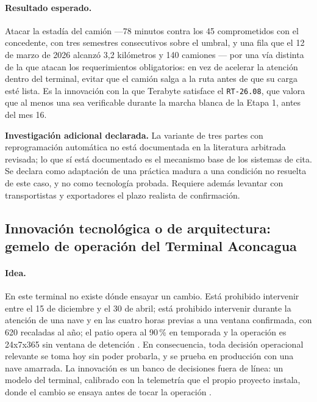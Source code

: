\paragraph*{Resultado esperado.}
Atacar la estadía del camión —78 minutos contra los 45 comprometidos con el
concedente, con tres semestres consecutivos sobre el umbral, y una fila que el
12 de marzo de 2026 alcanzó 3,2 kilómetros y 140 camiones \Hecho— por una vía
distinta de la que atacan los requerimientos obligatorios: en vez de acelerar
la atención dentro del terminal, evitar que el camión salga a la ruta antes de
que su carga esté lista. Es la innovación con la que Terabyte satisface el
\texttt{RT-26.08}, que valora que al menos una sea verificable durante la
marcha blanca de la Etapa 1, antes del mes 16.

\begin{bloqueDuda}
\textbf{Investigación adicional declarada.} La variante de tres partes con
reprogramación automática no está documentada en la literatura arbitrada
revisada; lo que sí está documentado es el mecanismo base de los sistemas de
cita. Se declara como adaptación de una práctica madura a una condición no
resuelta de este caso, y no como tecnología probada. Requiere además levantar
con transportistas y exportadores el plazo realista de confirmación.
\end{bloqueDuda}

\subsection{Innovación tecnológica o de arquitectura: gemelo de operación del
Terminal Aconcagua}

\paragraph*{Idea.}
En este terminal no existe dónde ensayar un cambio. Está prohibido intervenir
entre el 15 de diciembre y el 30 de abril; está prohibido intervenir durante la
atención de una nave y en las cuatro horas previas a una ventana confirmada,
con 620 recaladas al año; el patio opera al 90\,\% en temporada y la operación
es 24x7x365 sin ventana de detención \Hecho. En consecuencia, toda decisión
operacional relevante se toma hoy sin poder probarla, y se prueba en producción
con una nave amarrada. La innovación es un banco de decisiones fuera de línea:
un modelo del terminal, calibrado con la telemetría que el propio proyecto
instala, donde el cambio se ensaya antes de tocar la operación \Propuesta.

